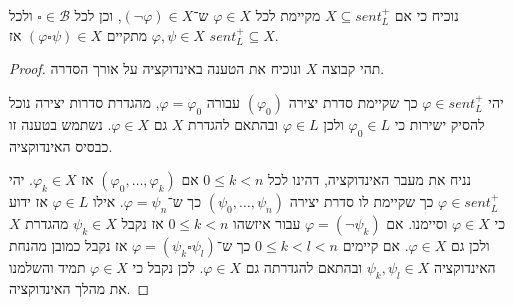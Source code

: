 \Question{}
נוכיח כי אם $X \subseteq sent_L^+$ מקיימת לכל $\varphi \in X$ ש־$(\lnot \varphi) \in X$, וכן לכל $\square \in \mathcal{B}$ ולכל $\varphi, \psi \in X$ מתקיים $(\varphi \square \psi) \in X$ אז $sent_L^+ \subseteq X$.
\begin{proof}
	תהי קבוצה $X$ ונוכיח את הטענה באינדוקציה על אורך הסדרה.

	יהי $\varphi \in sent_L^+$ כך שקיימת סדרת יצירה $(\varphi_0)$ עבורה $\varphi = \varphi_0$, מהגדרת סדרות יצירה נוכל להסיק ישירות כי $\varphi_0 \in L$ ולכן $\varphi \in L$ ובהתאם להגדרת $X$ גם $\varphi \in X$.
	נשתמש בטענה זו כבסיס האינדוקציה.

	נניח את מעבר האינדוקציה, דהינו לכל $0 \le k < n$ אם $(\varphi_0, \dots, \varphi_k)$ אז $\varphi_k \in X$.
	יהי $\varphi \in sent_L^+$ כך שקיימת לו סדרת יצירה $(\psi_0, \dots, \psi_n)$ כך ש־$\varphi = \psi_n$.
	אילו $\varphi \in L$ אז ידוע כי $\varphi \in X$ וסיימנו.
	אם $\varphi = (\lnot \psi_k)$ עבור איזשהו $0 \le k < n$ אז נקבל $\psi_k \in X$ מהגדרת $X$ ולכן גם $\varphi \in X$.
	אם קיימים $0 \le k < l < n$ כך ש־$\varphi = (\psi_k \square \psi_l)$ אז נקבל כמובן מהנחת האינדוקציה $\psi_k, \psi_l \in X$ ובהתאם להגדרתה גם $\varphi \in X$.
	לכן נקבל כי $\varphi \in X$ תמיד והשלמנו את מהלך האינדוקציה.
\end{proof}

